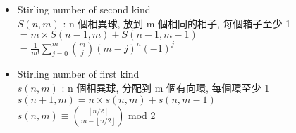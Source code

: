 \begin{itemize}
\item Stirling number of second kind \\
	\( S(n,m)\) :  n 個相異球, 放到 m 個相同的相子, 每個箱子至少 1 \\
	\( = m \times S(n-1,m) + S(n-1,m-1) \) \\
	\( = \frac{1}{m!} \sum_{j=0}^{m} \binom{m}{j} (m-j)^n (-1)^j \)
\item Stirling number of first kind \\
	\( s(n,m)\) :  n 個相異球, 分配到 m 個有向環, 每個環至少 1 \\
	\( s(n+1,m) = n \times s(n,m) + s(n,m-1) \) \\
	\( s(n,m) \equiv \binom{ \left \lfloor n/2 \right \rfloor }{ m-\left \lfloor n/2 \right \rfloor }\) mod 2
\end{itemize}